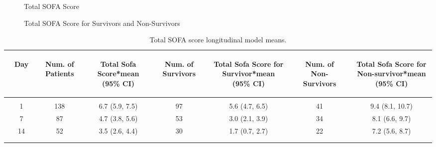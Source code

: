 \documentclass[dvips, 10pt]{article}
\begin{document}
\begin{figure}
\caption{Total SOFA Score}
\end{figure}
\clearpage

\begin{figure}
\caption{Total SOFA Score for Survivors and Non-Survivors}
\end{figure}
\clearpage
\begin{table}[t]
\caption
{ Total SOFA score longitudinal model means. }
\begin{center}
\begin{tabular}{ @{}l@{}
@{}c@{}@{}p{1.5em}@{}@{}c@{}@{}p{1.5em}@{}@{}c@{}@{}p{1.5em}@{}@{}c@{}@{}p{1.5em}@{}@{}c@{}@{}p{1.5em}@{}@{}c@{}@{}p{1.5em}@{}@{}c@{}
}
\hline

& \parbox{6em}{\begin{center}Day\end{center}} && \parbox{6em}{\begin{center}Num. of Patients\end{center}} && \parbox{6em}{\begin{center}Total Sofa Score*mean (95\% CI)\end{center}} && \parbox{6em}{\begin{center}Num. of Survivors\end{center}} && \parbox{6em}{\begin{center}Total Sofa Score for Survivor*mean (95\% CI)\end{center}} && \parbox{6em}{\begin{center}Num. of Non-Survivors\end{center}} && \parbox{6em}{\begin{center}Total Sofa Score for Non-survivor*mean (95\% CI)\end{center}} \\

\hline

\\
& 1 && 138 && 6.7 (5.9, 7.5) && 97 && 5.6 (4.7, 6.5) && 41 && 9.4 (8.1, 10.7) \\
& 7 && 87 && 4.7 (3.8, 5.6) && 53 && 3.0 (2.1, 3.9) && 34 && 8.1 (6.6, 9.7) \\
& 14 && 52 && 3.5 (2.6, 4.4) && 30 && 1.7 (0.7, 2.7) && 22 && 7.2 (5.6, 8.7) \\
\\
\hline \\

\end{tabular}

\end{center}
 \end{table}
\end{document}
